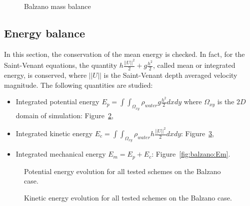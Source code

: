\begin{figure}[h!]
  \centering
  \caption{Balzano mass balance}\label{fig:balzano:massbalance}
\end{figure}

\subsection{Energy balance}

In this section, the conservation of the mean energy is checked. In fact, for the Saint-Venant equations,
the quantity $h \frac{||U||^2}{2} + g \frac{h^2}{2}$, called mean or integrated energy, is conserved,
where $||U||$ is the Saint-Venant depth averaged velocity magnitude.
The following quantities are studied:
\begin{itemize}
\item Integrated potential energy \textbf{$E_p =\int\int_{\Omega_{xy}}\rho_{water} g \frac{h^2}{2} dxdy$} where $\Omega_{xy}$ is the $2D$ domain of simulation: Figure~\ref{fig:balzano:Ep},
\item Integrated kinetic energy \textbf{$E_c =\int\int_{\Omega_{xy}} \rho_{water} h \frac{||U||^2}{2} dxdy$}: Figure~\ref{fig:balzano:Ec},
\item Integrated mechanical energy \textbf{$E_m = E_p + E_c$}: Figure~\ref{fig:balzano:Em}.
\end{itemize}

\begin{figure}[H]
  \centering
  \caption{Potential energy evolution for all tested schemes on the Balzano case.}
\label{fig:balzano:Ep}
\end{figure}

\begin{figure}[H]
  \centering
  \caption{Kinetic energy evolution for all tested schemes on the Balzano case.}
\label{fig:balzano:Ec}
\end{figure}

